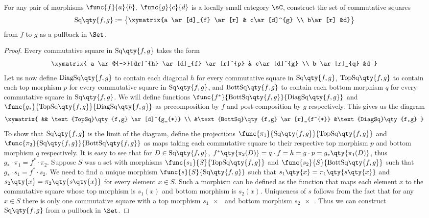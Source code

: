 \documentclass[main.tex]{subfiles}
\begin{document}
\paragraph{}
\begin{exercise}
	For any pair of morphisms $\func{f}{a}{b}$, $\func{g}{c}{d}$ is a locally
	small category $\sC$, construct the set of commutative squares
	$$\text{Sq}\qty{f,g} :=  \left\{\begin{gathered}\xymatrix{a \ar[d]_{f}
	\ar[r] & c\ar[d]^{g}  \\ b\ar[r] &d}\end{gathered}\right\}  $$ from $f$ to
	$g$ as a pullback in $\Set$.
\end{exercise}

\begin{proof}
	Every commutative square in $\text{Sq}\qty{f,g}$ takes the form
	$$\xymatrix{ a \ar@{-->}[dr]^{h} \ar[d]_{f} \ar[r]^{p} & c\ar[d]^{g} \\
	b \ar[r]_{q} &d  } $$
	Let us now define
	$\text{DiagSq}\qty{f,g}$ to contain each diagonal $h$ for every
	commutative square in $\text{Sq}\qty{f,g}$,
	$\text{TopSq}\qty{f,g}$ to contain each top morphism $p$ for
	every commutative square in $\text{Sq}\qty{f,g}$, and
	$\text{BottSq}\qty{f,g}$ to contain each bottom morphism $q$
	for every commutative square in $\text{Sq}\qty{f,g}$. We will
	define functions
	$\func{f^{*}}{\text{BottSq}\qty{f,g}}{\text{DiagSq}\qty{f,g}}$
	and
	$\func{g_{*}}{\text{TopSq}\qty{f,g}}{\text{DiagSq}\qty{f,g}}$
	as precomposition by $f$ and post-composition by $g$
	respectively. This gives us the diagram $$\xymatrix{  &&
		\text{TopSq}\qty{f,g} \ar[d]^{g_{*}}  \\
		&\text{BottSq}\qty{f,g}
	\ar[r]_{f^{*}} &\text{DiagSq}\qty{f,g}  } $$ To show that
	$\text{Sq}\qty{f,g}$ is the limit of the diagram, define the
	projections
	$\func{\pi_{1}}{\text{Sq}\qty{f,g}}{\text{TopSq}\qty{f,g}}$ and
	$\func{\pi_{2}}{\text{Sq}\qty{f,g}}{\text{BottSq}\qty{f,g}}$ as
	maps taking each commutative square to their respective top
	morphism $p$ and bottom morphism $q$ respectively. It is easy
	to see that for $D \in \text{Sq}\qty{f,g}$,
	$f^{*}\qty{\pi_{2}(D)} = q \cdot f = h = g \cdot p =
	g_{*}\qty{\pi_{1}(D)}$, thus $g_{*} \cdot \pi_{1} =  f^{*}
	\cdot \pi_{2}$. Suppose $S$ was a set with morphisms
	$\func{s_{1}}{S}{\text{TopSq}\qty{f,g}}$ and
	$\func{s_{2}}{S}{\text{BottSq}\qty{f,g}}$ such that $g_{*}
	\cdot s_{1} =  f^{*} \cdot s_{2}$. We need to find a unique
	morphism  $\func{s}{S}{\text{Sq}\qty{f,g}}$ such that
	$s_{1}\qty{x} = \pi_{1}\qty{s\qty{x}}$ and $s_{2}\qty{x} =
	\pi_{2}\qty{s\qty{x}}$ for every element $x \in S$. Such a
	morphism can be defined as the function that maps each element
	$x$ to the commutative square whose top morphism is $s_{1}(x)$
	and bottom morphism is $s_{2}(x)$. Uniqueness of $s$ follows
	from the fact that for any $x \in S$ there is only one
	commutative square with a top morphism $s_{1}\qty{x}$ and
	bottom morphism $s_{2}\qty{x}$. Thus we can construct
	$\text{Sq}\qty{f,g}$ from a pullback in $\Set$.

\end{proof}
\end{document}
